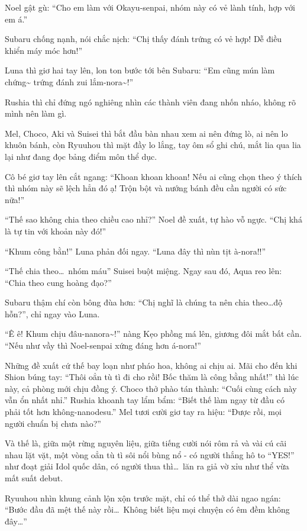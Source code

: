 \documentclass[../main.tex]{subfiles}
\begin{document}
Noel gật gù: ``Cho em làm với Okayu-senpai, nhóm này có vẻ lành tính, hợp với em á.''

Subaru chống nạnh, nói chắc nịch: ``Chị thấy đánh trứng có vẻ hợp! Dễ điều khiển máy móc hơn!''

Luna thì giơ hai tay lên, lon ton bước tới bên Subaru: ``Em cũng mún làm chứng\~{} trứng đánh zui lắm-nora\~{}!''

Rushia thì chỉ đứng ngó nghiêng nhìn các thành viên đang nhốn nháo, không rõ mình nên làm gì.

Mel, Choco, Aki và Suisei thì bắt đầu bàn nhau xem ai nên đứng lò, ai nên lo khuôn bánh, còn Ryuuhou thì mặt đầy lo lắng, tay ôm sổ ghi chú, mắt lia qua lia lại như đang đọc bảng điểm môn thể dục.

Cô bé giơ tay lên cắt ngang: ``Khoan khoan khoan! Nếu ai cũng chọn theo ý thích thì nhóm này sẽ lệch hẳn đó ạ! Trộn bột và nướng bánh đều cần người có sức nữa!''

``Thế sao không chia theo chiều cao nhỉ?'' Noel đề xuất, tự hào vỗ ngực. ``Chị khá là tự tin với khoản này đó!''

``Khum công bằn!'' Luna phản đối ngay. ``Luna đây thì nùn tịt à-nora!!''

``Thế chia theo\dots\ nhóm máu'' Suisei buột miệng. Ngay sau đó, Aqua reo lên: ``Chia theo cung hoàng đạo?''

Subaru thậm chí còn bông đùa hơn: ``Chị nghĩ là chúng ta nên chia theo\dots độ hỗn?'', chỉ ngay vào Luna.

``Ê ê! Khum chịu đâu-nanora\~{}!'' nàng Kẹo phồng má lên, giương đôi mắt bất cần. ``Nếu như vầy thì Noel-senpai xứng đáng hơn á-nora!''

Những đề xuất cứ thế bay loạn như pháo hoa, không ai chịu ai. Mãi cho đến khi Shion búng tay: ``Thôi oẳn tù tì đi cho rồi! Bốc thăm là công bằng nhất!'' thì lúc này, cả phòng mới chịu đồng ý. Choco thở phào tán thành: ``Cuối cùng cách này vẫn ổn nhất nhỉ.'' Rushia khoanh tay lẩm bẩm: ``Biết thế làm ngay từ đầu có phải tốt hơn không-nanodesu.'' Mel tươi cười giơ tay ra hiệu: ``Được rồi, mọi người chuẩn bị chưa nào?''

Và thế là, giữa một rừng nguyên liệu, giữa tiếng cười nói rôm rả và vài cú cãi nhau lặt vặt, một vòng oẳn tù tì sôi nổi bùng nổ - có người thắng hô to ``YES!'' như đoạt giải Idol quốc dân, có người thua thì\dots\ lăn ra giả vờ xỉu như thể vừa mất suất debut.

Ryuuhou nhìn khung cảnh lộn xộn trước mặt, chỉ có thể thở dài ngao ngán: ``Bước đầu đã mệt thế này rồi\dots\ Không biết liệu mọi chuyện có êm đềm không đây\dots''
\end{document}

